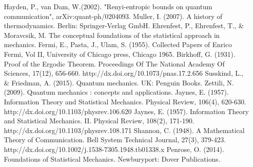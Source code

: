 \documentclass[11pt]{book}
\theoremstyle{definition}
\begin{document}
\begin{thebibliography}{10}
Hayden, P., van Dam, W.(2002). "Renyi-entropic bounds on quantum communication", arXiv:quant-ph/0204093.
 Muller, I. (2007). A history of thermodynamics. Berlin: Springer-Verlag GmbH.
Ehrenfest, P., Ehrenfest, T., \& Moravcsik, M. The conceptual foundations of the statistical approach in mechanics.
 Fermi, E., Pasta, J., Ulam, S. (1955). Collected Papers of Enrico Fermi, Vol II, University of Chicago press, Chicago 1965.
Birkhoff, G. (1931). Proof of the Ergodic Theorem. Proceedings Of The National Academy Of Sciences, 17(12), 656-660. http://dx.doi.org/10.1073/pnas.17.2.656
Susskind, L., \& Friedman, A. (2015). Quantum mechanics. UK: Penguin Books.
Zettili, N. (2009). Quantum mechanics : concepts and applications.
 Jaynes, E. (1957). Information Theory and Statistical Mechanics. Physical Review, 106(4), 620-630. http://dx.doi.org/10.1103/physrev.106.620
 Jaynes, E. (1957). Information Theory and Statistical Mechanics. II. Physical Review, 108(2), 171-190. http://dx.doi.org/10.1103/physrev.108.171
Shannon, C. (1948). A Mathematical Theory of Communication. Bell System Technical Journal, 27(3), 379-423. http://dx.doi.org/10.1002/j.1538-7305.1948.tb01338.x
Penrose, O. (2014). Foundations of Statistical Mechanics. Newburyport: Dover Publications.
\end{thebibliography}



 
\end{document}
